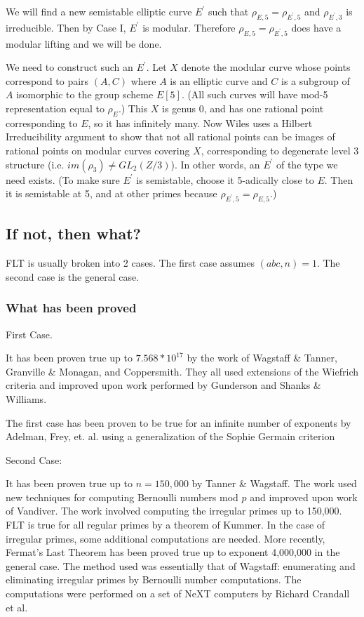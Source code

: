 {\begin{itemize}
    We will find a new semistable elliptic curve $E^\prime$ such that
    $\rho_{E,5} = \rho_{E^\prime,5}$ and $\rho_{E^\prime,3}$ is
    irreducible.  Then by Case I, $E^\prime$ is modular.  Therefore
    $\rho_{E,5}= \rho_{E^\prime,5}$ does have a modular lifting and we
    will be done.
    
    We need to construct such an $E^\prime$.  Let $X$ denote the modular
    curve whose points correspond to pairs $(A, C)$ where $A$ is an
    elliptic curve and $C$ is a subgroup of $A$ isomorphic to the group
    scheme $E[5]$.  (All such curves will have mod-5 representation
    equal to $\rho_E$.)  This $X$ is genus 0, and has one rational point
    corresponding to $E$, so it has infinitely many.  Now Wiles uses a
    Hilbert Irreducibility argument to show that not all rational points
    can be images of rational points on modular curves covering $X$,
    corresponding to degenerate level 3 structure (i.e. $im(\rho_3) \neq
    GL_2(Z/3)$).  In other words, an $E^\prime$ of the type we need
    exists.  (To make sure $E^\prime$ is semistable, choose it
    5-adically close to $E$.  Then it is semistable at 5, and at other
    primes because $\rho_{E^\prime,5} = \rho_{E,5}$.)
  \end{itemize}

  \subsection{If not, then what?}

  FLT is usually broken into 2 cases. The first case assumes $(abc,n) =
  1$. The second case is the general case.

  \subsubsection{What has been proved}
   

  First Case.

  It has been proven true up to $7.568*10^{17}$ by the work of Wagstaff
  \& Tanner, Granville \& Monagan, and Coppersmith. They all used
  extensions of the Wiefrich criteria and improved upon work performed
  by Gunderson and Shanks \& Williams.

  The first case has been proven to be true for an infinite number of
  exponents by Adelman, Frey, et. al. using a generalization of the
  Sophie Germain criterion


  \noindent Second Case:

  It has been proven true up to $n = 150,000$ by Tanner \& Wagstaff. The
  work used new techniques for computing Bernoulli numbers mod $p$ and
  improved upon work of Vandiver. The work involved computing the
  irregular primes up to 150,000. FLT is true for all regular primes by
  a theorem of Kummer. In the case of irregular primes, some additional
  computations are needed. More recently, Fermat's Last Theorem has been
  proved true up to exponent 4,000,000 in the general case. The method
  used was essentially that of Wagstaff: enumerating and eliminating
  irregular primes by Bernoulli number computations. The computations
  were performed on a set of NeXT computers by Richard Crandall et al.

}

